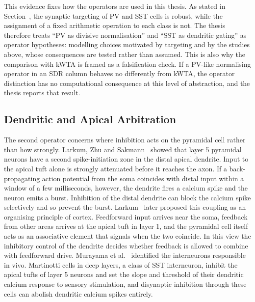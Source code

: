 This evidence fixes how the operators are used in this thesis. As stated in
Section~, the synaptic targeting of PV and SST cells is robust, while the
assignment of a fixed arithmetic operation to each class is not. The thesis
therefore treats ``PV as divisive normalisation'' and ``SST as dendritic
gating'' as operator hypotheses: modelling choices motivated by targeting and
by the studies above, whose consequences are tested rather than assumed. This
is also why the comparison with kWTA is framed as a falsification check. If a
PV-like normalising operator in an SDR column behaves no differently from kWTA,
the operator distinction has no computational consequence at this level of
abstraction, and the thesis reports that result.

\subsection{Dendritic and Apical Arbitration}
\label{subsec:comp-apical}

The second operator concerns where inhibition acts on the pyramidal cell rather
than how strongly. Larkum, Zhu and Sakmann~\cite{larkum1999new} showed that layer
5 pyramidal neurons have a second spike-initiation zone in the distal apical
dendrite. Input to the apical tuft alone is strongly attenuated before it
reaches the axon. If a back-propagating action potential from the soma
coincides with distal input within a window of a few milliseconds, however, the
dendrite fires a calcium spike and the neuron emits a burst. Inhibition of the
distal dendrite can block the calcium spike selectively and so prevent the
burst. Larkum~\cite{larkum2013} later proposed this coupling as an organising
principle of cortex. Feedforward input arrives near the soma, feedback from
other areas arrives at the apical tuft in layer 1, and the pyramidal cell itself
acts as an associative element that signals when the two coincide. In this view
the inhibitory control of the dendrite decides whether feedback is allowed to
combine with feedforward drive. Murayama et al.~\cite{murayama2009dendritic}
identified the interneurons responsible in vivo. Martinotti cells in deep
layers, a class of SST interneuron, inhibit the apical tufts of layer 5 neurons
and set the slope and threshold of their dendritic calcium response to sensory
stimulation, and disynaptic inhibition through these cells can abolish
dendritic calcium spikes entirely.

